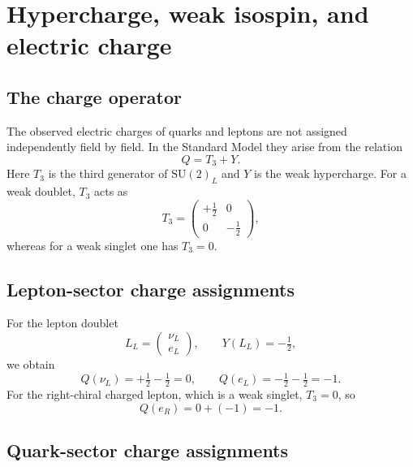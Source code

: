 \documentclass[11pt,a4paper]{article}
\newcommand{\half}{\tfrac12}
\newcommand{\SUw}{\mathrm{SU}(2)_L}
\begin{document}
\section{Hypercharge, weak isospin, and electric charge}

\subsection{The charge operator}

The observed electric charges of quarks and leptons are not assigned independently field by field. In the Standard Model they arise from the relation
\begin{equation}
Q=T_3+Y.
\label{eq:charge-operator-expanded}
\end{equation}
Here \(T_3\) is the third generator of \(\SUw\) and \(Y\) is the weak hypercharge. For a weak doublet, \(T_3\) acts as
\begin{equation}
T_3=\begin{pmatrix}+\half & 0\\ 0 & -\half\end{pmatrix},
\label{eq:T3-doublet-expanded}
\end{equation}
whereas for a weak singlet one has \(T_3=0\).




\subsection{Lepton-sector charge assignments}

For the lepton doublet
\[
L_L=\begin{pmatrix}\nu_L\\ e_L\end{pmatrix},
\qquad Y(L_L)=-\half,
\]
we obtain
\begin{equation}
Q(\nu_L)=+\half-\half=0,
\qquad
Q(e_L)=-\half-\half=-1.
\label{eq:lepton-charges-expanded}
\end{equation}
For the right-chiral charged lepton, which is a weak singlet, \(T_3=0\), so
\begin{equation}
Q(e_R)=0+(-1)=-1.
\label{eq:eR-charge-expanded}
\end{equation}




\subsection{Quark-sector charge assignments}
\end{document}
